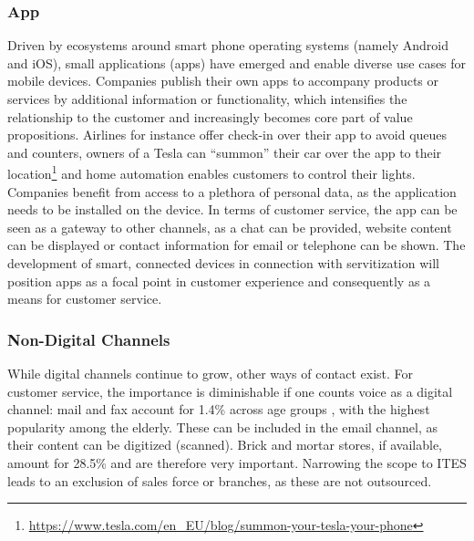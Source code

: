 		\subsubsection{App}
		Driven by ecosystems around smart phone operating systems (namely Android and iOS), small applications (apps) have emerged and enable diverse use cases for mobile devices. Companies publish their own apps to accompany products or services by additional information or functionality, which intensifies the relationship to the customer and increasingly becomes core part of value propositions. Airlines for instance offer check-in over their app to avoid queues and counters, owners of a Tesla can \enquote{summon} their car over the app to their location\footnote{\cf \url{https://www.tesla.com/en_EU/blog/summon-your-tesla-your-phone} } and home automation enables customers to control their lights. Companies benefit from access to a plethora of personal data, as the application needs to be installed on the device. In terms of customer service, the app can be seen as a gateway to other channels, as a chat can be provided, website content can be displayed or contact information for email or telephone can be shown. The development of smart, connected devices \citep{PorterHeppelmann15hbr} in connection with servitization \citep{servitization} will position apps as a focal point in customer experience and consequently as a means for customer service. 
		
		\subsubsection{Non-Digital Channels}
		While digital channels continue to grow, other ways of contact exist. For customer service, the importance is diminishable if one counts voice as a digital channel: mail and fax account for 1.4\% across age groups \citep{Agnischock2015}, with the highest popularity among the elderly. These can be included in the email channel, as their content can be digitized (\viz scanned). Brick and mortar stores, if available, amount for 28.5\% and are therefore very important. Narrowing the scope to \acrshort{ITES} leads to an exclusion of sales force or branches, as these are not outsourced. 
		
	
